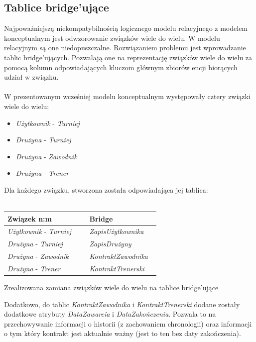\documentclass{mwrep}
\begin{document}
\subsection{Tablice bridge'ujące}
Najpoważniejszą niekompatybilnością logicznego modelu relacyjnego z modelem konceptualnym jest odwzorowanie związków
wiele do wielu. W modelu relacyjnym są one niedopuszczalne. Rozwiązaniem problemu jest wprowadzanie tablic bridge'ujących.
Pozwalają one na reprezentację związków wiele do wielu za pomocą kolumn odpowiadających kluczom głównym zbiorów encji biorących
udział w związku\cite{Kowalczyk1}.\\
\\
\indent W prezentowanym wcześniej modelu konceptualnym występowały cztery związki wiele do wielu: 
\\
\begin{itemize}
	\item \emph{Użytkownik} - \emph{Turniej}
	\item \emph{Drużyna} - \emph{Turniej}
	\item \emph{Drużyna} - \emph{Zawodnik}
	\item \emph{Drużyna} - \emph{Trener}
\end{itemize}
\vspace{0.5cm}
Dla każdego związku, stworzona została odpowiadająca jej tablica: \\
\\
\begin{threeparttable}[H]
	\begin{tabular}{|p{0.5\linewidth}|p{0.43\linewidth}|}
	\hline
	Związek n:m &  Bridge \\ \hline
	\emph{Użytkownik} - \emph{Turniej} & \emph{ZapisUżytkownika} \\ \hline
	\emph{Drużyna} - \emph{Turniej} &  \emph{ZapisDrużyny} \\ \hline
	\emph{Drużyna} - \emph{Zawodnik} &  \emph{KontraktZawodnika} \\ \hline
	\emph{Drużyna} - \emph{Trener} &  \emph{KontraktTrenerski} \\ \hline
	\end{tabular}	
	\caption{Zrealizowana zamiana związków wiele do wielu na tablice bridge'ujące}
\end{threeparttable}
\vspace{0.5cm}

Dodatkowo, do tablic \emph{KontraktZawodnika} i \emph{KontraktTrenerski} dodane zostały dodatkowe 
atrybuty \emph{DataZawarcia} i \emph{DataZakończenia}. Pozwala to na przechowywanie informacji o historii
(z zachowaniem chronologii) oraz informacji o tym który kontrakt jest aktualnie ważny (jest to ten bez 
daty zakończenia).
\end{document}
